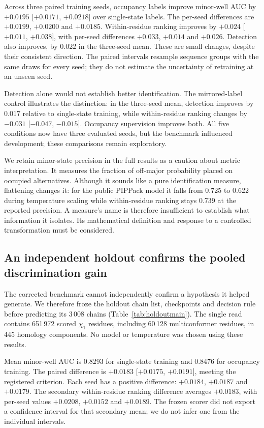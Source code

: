 \documentclass[10pt,twocolumn,a4paper]{article}
\begin{document}
Across three paired training seeds, occupancy labels improve minor-well AUC by $+0.0195$ [$+0.0171$, $+0.0218$] over single-state labels. The per-seed differences are $+0.0199$, $+0.0200$ and $+0.0185$. Within-residue ranking improves by $+0.024$ [$+0.011$, $+0.038$], with per-seed differences $+0.033$, $+0.014$ and $+0.026$. Detection also improves, by 0.022 in the three-seed mean. These are small changes, despite their consistent direction. The paired intervals resample sequence groups with the same draws for every seed; they do not estimate the uncertainty of retraining at an unseen seed.

Detection alone would not establish better identification. The mirrored-label control illustrates the distinction: in the three-seed mean, detection improves by 0.017 relative to single-state training, while within-residue ranking changes by $-0.031$ [$-0.047$, $-0.015$]. Occupancy supervision improves both. All five conditions now have three evaluated seeds, but the benchmark influenced development; these comparisons remain exploratory.

We retain minor-state precision in the full results as a caution about metric interpretation. It measures the fraction of off-major probability placed on occupied alternatives. Although it sounds like a pure identification measure, flattening changes it: for the public PIPPack model it falls from 0.725 to 0.622 during temperature scaling while within-residue ranking stays 0.739 at the reported precision. A measure's name is therefore insufficient to establish what information it isolates. Its mathematical definition and response to a controlled transformation must be considered.

\subsection{An independent holdout confirms the pooled discrimination gain}
\label{sec:holdoutmain}
The corrected benchmark cannot independently confirm a hypothesis it helped generate. We therefore froze the holdout chain list, checkpoints and decision rule before predicting its 3\,008 chains (Table~\ref{tab:holdoutmain}). The single read contains 651\,972 scored $\chi_1$ residues, including 60\,128 multiconformer residues, in 445 homology components. No model or temperature was chosen using these results.

Mean minor-well AUC is 0.8293 for single-state training and 0.8476 for occupancy training. The paired difference is $+0.0183$ [$+0.0175$, $+0.0191$], meeting the registered criterion. Each seed has a positive difference: $+0.0184$, $+0.0187$ and $+0.0179$. The secondary within-residue ranking difference averages $+0.0183$, with per-seed values $+0.0208$, $+0.0152$ and $+0.0189$. The frozen scorer did not export a confidence interval for that secondary mean; we do not infer one from the individual intervals.
\end{document}
